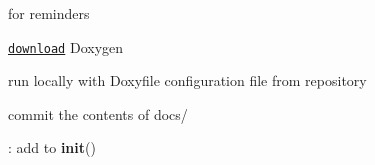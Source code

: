 
\begin{DoxyRefList}
\item[\label{todo__todo000047}%
\Hypertarget{todo__todo000047}%
Page \hyperlink{md__r_e_a_d_m_e}{Mu\+MoT} ]for reminders
\begin{DoxyItemize}
\item \href{http://www.stack.nl/~dimitri/doxygen/download.html}{\tt download} Doxygen
\item run locally with {\ttfamily Doxyfile} configuration file from repository
\item commit the contents of {\ttfamily docs/} 
\end{DoxyItemize}
\item[\label{todo__todo000039}%
\Hypertarget{todo__todo000039}%
Global \hyperlink{class_mu_mo_t_1_1_mu_mo_tbifurcation_view_a797e92fe19ce2636a49bf1400a69fc49}{Mu\+Mo\+Tbifurcation\+View.\+\_\+py\+D\+Scont} ]\+: add to {\bfseries init}() 


\end{DoxyRefList}
